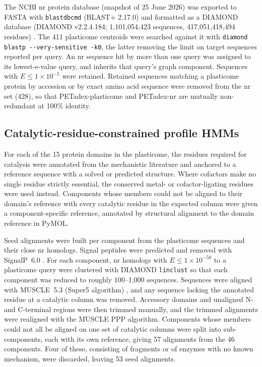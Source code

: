 \documentclass[pdflatex,sn-nature,iicol]{sn-jnl}%
\begin{document}
The NCBI nr protein database (snapshot of 25 June 2026) was exported to FASTA with \texttt{blastdbcmd} (BLAST+ 2.17.0) and formatted as a DIAMOND database (DIAMOND v2.2.4.184; 1,101,054,423 sequences, 417,051,418,494 residues) \citep{buchfink2021diamond,camacho2009blast}. The 411 plasticome centroids were searched against it with \texttt{diamond blastp -{}-very-sensitive -k0}, the latter removing the limit on target sequences reported per query. An nr sequence hit by more than one query was assigned to its lowest-e-value query, and inherits that query's graph component. Sequences with $E \le 1\times10^{-5}$ were retained. Retained sequences matching a plasticome protein by accession or by exact amino acid sequence were removed from the nr set (428), so that PETadex-plasticome and PETadex-nr are mutually non-redundant at 100\% identity.

\subsection{Catalytic-residue-constrained profile HMMs}

For each of the 15 protein domains in the plasticome, the residues required for catalysis were annotated from the mechanistic literature and anchored to a reference sequence with a solved or predicted structure. Where cofactors make no single residue strictly essential, the conserved metal- or cofactor-ligating residues were used instead. Components whose members could not be aligned to their domain's reference with every catalytic residue in the expected column were given a component-specific reference, annotated by structural alignment to the domain reference in PyMOL.

Seed alignments were built per component from the plasticome sequences and their close nr homologs. Signal peptides were predicted and removed with SignalP~6.0 \citep{teufel2022signalp}. For each component, nr homologs with $E \le 1\times10^{-50}$ to a plasticome query were clustered with DIAMOND \texttt{linclust} so that each component was reduced to roughly 100--1,000 sequences. Sequences were aligned with MUSCLE~5.3 (Super5 algorithm) \citep{edgar2022muscle5}, and any sequence lacking the annotated residue at a catalytic column was removed. Accessory domains and unaligned N- and C-terminal regions were then trimmed manually, and the trimmed alignments were realigned with the MUSCLE PPP algorithm. Components whose members could not all be aligned on one set of catalytic columns were split into sub-components, each with its own reference, giving 57 alignments from the 46 components. Four of these, consisting of fragments or of enzymes with no known mechanism, were discarded, leaving 53 seed alignments.
\end{document}
